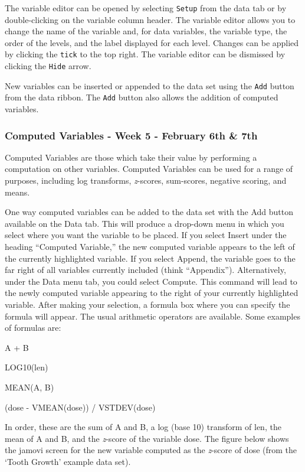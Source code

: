 \documentclass[
]{book}
\begin{document}
The variable editor can be opened by selecting \texttt{Setup} from the data tab or by double-clicking on the variable column header. The variable editor allows you to change the name of the variable and, for data variables, the variable type, the order of the levels, and the label displayed for each level. Changes can be applied by clicking the \texttt{tick} to the top right. The variable editor can be dismissed by clicking the \texttt{Hide} arrow.

New variables can be inserted or appended to the data set using the \texttt{Add} button from the data ribbon. The \texttt{Add} button also allows the addition of computed variables.

\hypertarget{computed-variables---week-5---february-6th-7th}{%
\subsubsection{Computed Variables - Week 5 - February 6th \& 7th}\label{computed-variables---week-5---february-6th-7th}}

Computed Variables are those which take their value by performing a computation on other variables. Computed Variables can be used for a range of purposes, including log transforms, \emph{z}-scores, sum-scores, negative scoring, and means.

One way computed variables can be added to the data set with the {Add} button available on the {Data} tab. This will produce a drop-down menu in which you select where you want the variable to be placed. If you select {Insert} under the heading ``Computed Variable,'' the new computed variable appears to the left of the currently highlighted variable. If you select {Append}, the variable goes to the far right of all variables currently included (think ``Appendix''). Alternatively, under the {Data} menu tab, you could select {Compute}. This command will lead to the newly computed variable appearing to the right of your currently highlighted variable. After making your selection, a formula box where you can specify the formula will appear. The usual arithmetic operators are available. Some examples of formulas are:

A + B

LOG10(len)

MEAN(A, B)

(dose - VMEAN(dose)) / VSTDEV(dose)

In order, these are the sum of A and B, a log (base 10) transform of len, the mean of A and B, and the \emph{z}-score of the variable dose. The figure below shows the jamovi screen for the new variable computed as the \emph{z}-score of dose (from the `Tooth Growth' example data set).
\end{document}

